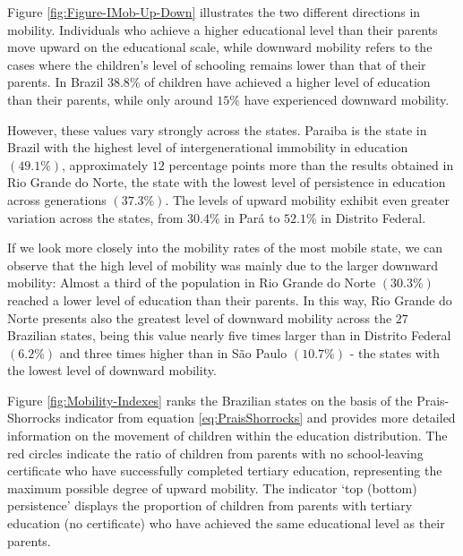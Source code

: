 \documentclass[a4paper, 12pt]{article}
\begin{document}
Figure \ref{fig:Figure-IMob-Up-Down} illustrates the two different directions in mobility. Individuals who achieve a higher educational level than their parents move upward on the educational scale, while downward mobility refers to the cases where the children’s level of schooling remains lower than that of their parents. In Brazil $38.8\%$ of children have achieved a higher level of education than their parents, while only around $15\%$ have experienced downward mobility. 

However, these values vary strongly across the states. Paraiba is the state in Brazil with the highest level of intergenerational immobility in education $(49.1\%)$, approximately $12$ percentage points more than the results obtained in Rio Grande do Norte, the state with the lowest level of persistence in education across generations $(37.3\%)$. The levels of upward mobility exhibit even greater variation across the states, from $30.4\%$ in Pará to $52.1\%$ in Distrito Federal.  

If we look more closely into the mobility rates of the most mobile state, we can observe that the high level of mobility was mainly due to the larger downward mobility: Almost a third of the population in Rio Grande do Norte $(30.3\%)$ reached a lower level of education than their parents. In this way, Rio Grande do Norte presents also the greatest level of downward mobility across the $27$ Brazilian states, being this value nearly five times larger than in Distrito Federal $(6.2\%)$ and three times higher than in São Paulo $(10.7\%)$ - the states with the lowest level of downward mobility.




Figure \ref{fig:Mobility-Indexes} ranks the Brazilian states on the basis of the Prais-Shorrocks indicator from equation \eqref{eq:PraisShorrocks} and provides more detailed information on the movement of children within the education distribution. The red circles indicate the ratio of children from parents with no school-leaving certificate who have successfully completed tertiary education, representing the maximum possible degree of upward mobility. The indicator ‘top (bottom) persistence’ displays the proportion of children from parents with tertiary education (no certificate) who have achieved the same educational level as their parents.
\end{document}
